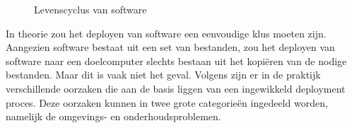 \begin{figure}[!ht]
\centering
{}
\caption{Levenscyclus van software \citep{carzaniga1998characterization}}
\label{fig:softwareLevenscyclus}
\end{figure}

In theorie zou het deployen van software een eenvoudige klus moeten zijn.
Aangezien software bestaat uit een set van bestanden, zou het deployen van software naar een doelcomputer slechts bestaan uit het kopiëren van de nodige bestanden.
Maar dit is vaak niet het geval.
Volgens \citet{dolstra2006purely} zijn er in de praktijk verschillende oorzaken die aan de basis liggen van een ingewikkeld deployment proces.
Deze oorzaken kunnen in twee grote categorieën ingedeeld worden, namelijk de omgevings- en onderhoudsproblemen.

